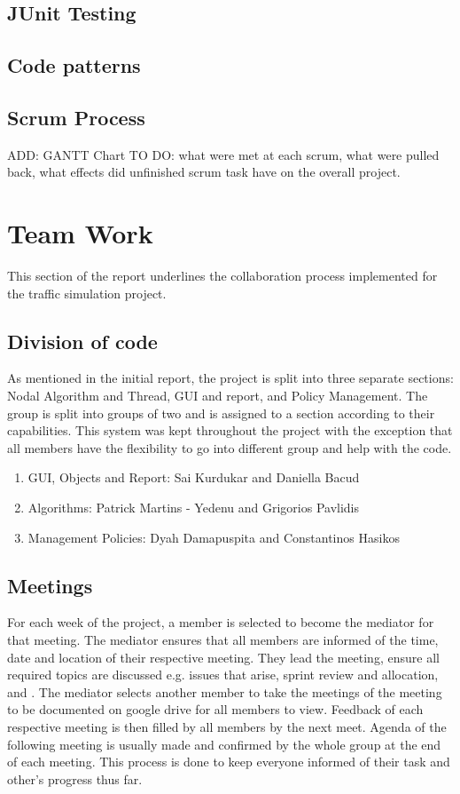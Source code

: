 \documentclass{article}[11pt,Tahoma]
\begin{document}
		\subsection{JUnit Testing}
	 	\subsection{Code patterns}
		\subsection{Scrum Process}
			ADD: GANTT Chart
			TO DO: what were met at each scrum, what were pulled back, what effects did unfinished scrum task have on the overall project.
	\section{Team Work}
		This section of the report underlines the collaboration process implemented for the traffic simulation project.
		\subsection{Division of code}
			As mentioned in the initial report, the project is split into three separate sections: Nodal Algorithm and Thread, GUI and report, and Policy Management.  The group is split into groups of two and is assigned to a section according to their capabilities.  This system was kept throughout the project with the exception that all members have the flexibility to go into different group and help with the code.  
			\begin{enumerate}[noitemsep]
                \item GUI, Objects and Report: Sai Kurdukar and Daniella Bacud
                \item Algorithms: Patrick Martins - Yedenu and Grigorios Pavlidis
                \item Management Policies: Dyah Damapuspita and Constantinos Hasikos
            \end{enumerate}
		\subsection{Meetings}
			For each week of the project, a member is selected to become the mediator for that meeting.  The mediator ensures that all members are informed of the time, date and location of their respective meeting.  They lead the meeting, ensure all required topics are discussed e.g. issues that arise, sprint review and allocation, and .  The mediator selects another member to take the meetings of the meeting to be documented on google drive for all members to view.  Feedback of each respective meeting is then filled by all members by the next meet.  Agenda of the following meeting is usually made and confirmed by the whole group at the end of each meeting.  This process is done to keep everyone informed of their task and other's progress thus far.
\end{document}
